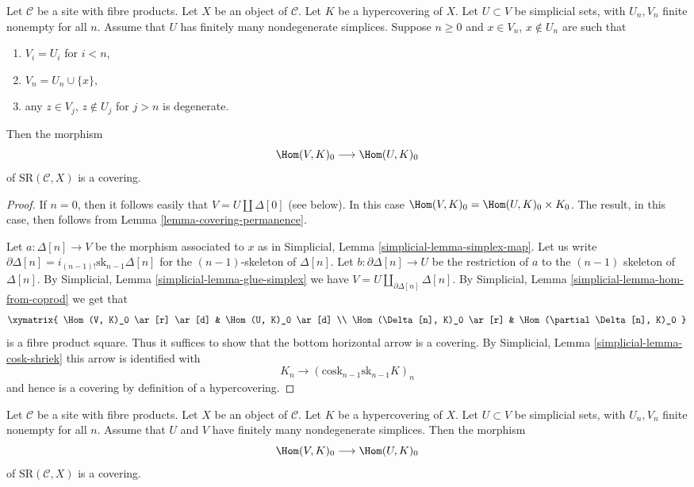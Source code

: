 \begin{lemma}
\label{lemma-one-more-simplex}
Let $\mathcal{C}$ be a site with fibre products.
Let $X$ be an object of $\mathcal{C}$.
Let $K$ be a hypercovering of $X$.
Let $U \subset V$ be simplicial sets, with $U_n, V_n$
finite nonempty for all $n$.
Assume that $U$ has finitely many nondegenerate simplices.
Suppose $n \geq 0$ and $x \in V_n$,
$x \not \in U_n$ are such that
\begin{enumerate}
\item $V_i = U_i$ for $i < n$,
\item $V_n = U_n \cup \{x\}$,
\item any $z \in V_j$, $z \not \in U_j$ for $j > n$
is degenerate.
\end{enumerate}
Then the morphism
$$
\Hom(V, K)_0
\longrightarrow
\Hom(U, K)_0
$$
of $\text{SR}(\mathcal{C}, X)$ is a covering.
\end{lemma}

\begin{proof}
If $n = 0$, then it follows easily that $V = U \amalg \Delta[0]$
(see below). In this case $\Hom(V, K)_0 =
\Hom(U, K)_0 \times K_0$. The result, in this case, then follows
from Lemma \ref{lemma-covering-permanence}.

\medskip\noindent
Let $a : \Delta[n] \to V$ be the morphism associated to $x$
as in Simplicial, Lemma \ref{simplicial-lemma-simplex-map}.
Let us write $\partial \Delta[n] = i_{(n-1)!} \text{sk}_{n - 1} \Delta[n]$
for the $(n - 1)$-skeleton of $\Delta[n]$.
Let $b : \partial \Delta[n] \to U$ be the restriction
of $a$ to the $(n - 1)$ skeleton of $\Delta[n]$. By
Simplicial, Lemma \ref{simplicial-lemma-glue-simplex}
we have $V = U \amalg_{\partial \Delta[n]} \Delta[n]$. By
Simplicial, Lemma
\ref{simplicial-lemma-hom-from-coprod}
we get that
$$
\xymatrix{
\Hom(V, K)_0 \ar[r] \ar[d] &
\Hom(U, K)_0 \ar[d] \\
\Hom(\Delta[n], K)_0 \ar[r] &
\Hom(\partial \Delta[n], K)_0
}
$$
is a fibre product square. Thus it suffices to show that
the bottom horizontal arrow is a covering. By
Simplicial, Lemma \ref{simplicial-lemma-cosk-shriek}
this arrow is identified with
$$
K_n \to (\text{cosk}_{n - 1} \text{sk}_{n - 1} K)_n
$$
and hence is a covering by definition of a hypercovering.
\end{proof}

\begin{lemma}
\label{lemma-add-simplices}
Let $\mathcal{C}$ be a site with fibre products.
Let $X$ be an object of $\mathcal{C}$.
Let $K$ be a hypercovering of $X$.
Let $U \subset V$ be simplicial sets, with $U_n, V_n$
finite nonempty for all $n$.
Assume that $U$ and $V$ have finitely many nondegenerate simplices.
Then the morphism
$$
\Hom(V, K)_0
\longrightarrow
\Hom(U, K)_0
$$
of $\text{SR}(\mathcal{C}, X)$ is a covering.
\end{lemma}

